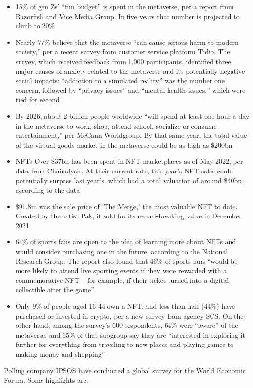 {\begin{itemize}
\item 15\% of gen Zs’ “fun budget” is spent in the metaverse, per a report from Razorfish and Vice Media Group. In five years that number is projected to climb to 20\%
\item Nearly 77\% believe that the metaverse “can cause serious harm to modern society,” per a recent survey from customer service platform Tidio. The survey, which received feedback from 1,000 participants, identified three major causes of anxiety related to the metaverse and its potentially negative social impacts: “addiction to a simulated reality” was the number one concern, followed by “privacy issues” and “mental health issues,” which were tied for second
\item By 2026, about 2 billion people worldwide “will spend at least one hour a day in the metaverse to work, shop, attend school, socialize or consume entertainment,” per McCann Worldgroup. By that same year, the total value of the virtual goods market in the metaverse could be as high as \$200bn
\item NFTs
Over \$37bn has been spent in NFT marketplaces as of May 2022, per data from Chainalysis. At their current rate, this year’s NFT sales could potentially surpass last year’s, which had a total valuation of around \$40bn, according to the data
\item \$91.8m was the sale price of ‘The Merge,’ the most valuable NFT to date. Created by the artist Pak, it sold for its record-breaking value in December 2021
\item 64\% of sports fans are open to the idea of learning more about NFTs and would consider purchasing one in the future, according to the National Research Group. The report also found that 46\% of sports fans “would be more likely to attend live sporting events if they were rewarded with a commemorative NFT – for example, if their ticket turned into a digital collectible after the game”
\item Only 9\% of people aged 16-44 own a NFT, and less than half (44\%) have purchased or invested in crypto, per a new survey from agency SCS. On the other hand, among the survey’s 600 respondents, 64\% were “aware” of the metaverse, and 65\% of that subgroup say they are “interested in exploring it further for everything from traveling to new places and playing games to making money and shopping”
\end{itemize}}
Polling company IPSOS \href{https://www.ipsos.com/en/global-advisor-metaverse-extended-reality-may-2022}{have conducted} a global survey for the World Economic Forum. Some highlights are:
